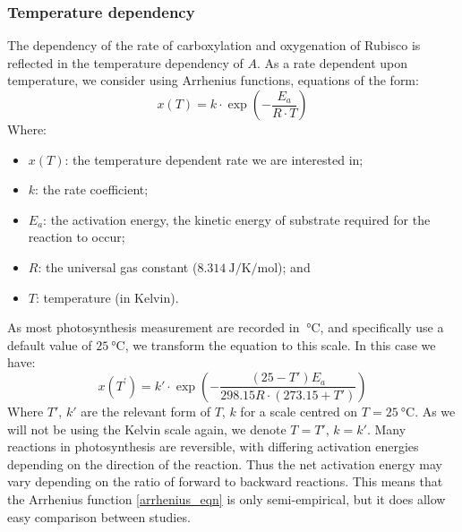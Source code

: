 \documentclass[11pt]{article} %
\begin{document}
\subsubsection{Temperature dependency}
The dependency of the rate of carboxylation and oxygenation of Rubisco is reflected in the temperature dependency of $A$. As a rate dependent upon temperature, we consider using Arrhenius functions, equations of the form:
\begin{equation} \label{arrhenius_eqn_kelvin}
x(T) = k \cdot \exp \left(-\frac{E_a}{R \cdot T}\right)
\end{equation}
Where:
\begin{itemize}
 \item $x(T)$: the temperature dependent rate we are interested in;
 \item $k$: the rate coefficient;
 \item $E_a$: the activation energy, the kinetic energy of substrate required for the reaction to occur;
 \item $R$: the universal gas constant ($\SI{8.314}{\J \per \K \per \mol}$); and
 \item $T$: temperature (in Kelvin).
\end{itemize}
As most photosynthesis measurement are recorded in $\SI{}{\celsius}$, and specifically use a default value of $\SI{25}{\celsius}$, we transform the equation to this scale. In this case we have:
\begin{equation} \label{arrhenius_eqn}
x(T^\prime) = k' \cdot \exp \left(-\frac{(25 - T')E_a}{298.15 R \cdot (273.15 + T')}\right)
\end{equation}
Where $T'$, $k'$ are the relevant form of $T$, $k$ for a scale centred on $T = \SI{25}{\celsius}$. As we will not be using the Kelvin scale again, we denote $T = T'$, $k = k'$.
Many reactions in photosynthesis are reversible, with differing activation energies depending on the direction of the reaction. Thus the net activation energy may vary depending on the ratio of forward to backward reactions. This means that the Arrhenius function \eqref{arrhenius_eqn} is only semi-empirical, but it does allow easy comparison between studies.
\end{document}
